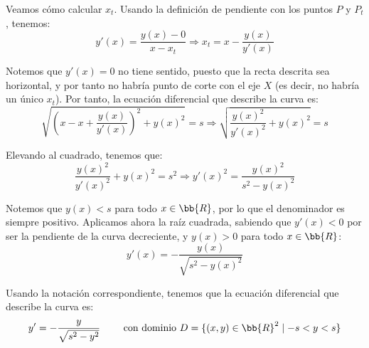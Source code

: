 \begin{ejercicio}
    Veamos cómo calcular $x_t$. Usando la definición de pendiente con los puntos $P$ y $P_t$, tenemos:
    \begin{equation*}
        y'(x) = \dfrac{y(x) - 0}{x - x_t} \Longrightarrow x_t = x - \dfrac{y(x)}{y'(x)}
    \end{equation*}

    Notemos que $y'(x)=0$ no tiene sentido, puesto que la recta descrita sea horizontal, y por tanto no habría punto de corte con el eje $X$ (es decir, no habría un único $x_t$). Por tanto, la ecuación diferencial que describe la curva es:
    \begin{equation*}
        \sqrt{\left(x-x + \dfrac{y(x)}{y'(x)}\right)^2 + y(x)^2} = s
        \Longrightarrow
        \sqrt{\dfrac{y(x)^2}{y'(x)^2} + y(x)^2} = s
    \end{equation*}

    Elevando al cuadrado, tenemos que:
    \begin{equation*}
        \dfrac{y(x)^2}{y'(x)^2} + y(x)^2 = s^2
        \Longrightarrow
        y'(x)^2 = \dfrac{y(x)^2}{s^2 - y(x)^2}
    \end{equation*}

    Notemos que $y(x)<s$ para todo $x\in \bb{R}$, por lo que el denominador es siempre positivo. Aplicamos ahora la raíz cuadrada, sabiendo que $y'(x)<0$ por ser la pendiente de la curva decreciente, y $y(x)>0$ para todo $x\in \bb{R}$:
    \begin{equation*}
        y'(x) = -\dfrac{y(x)}{\sqrt{s^2 - y(x)^2}}
    \end{equation*}

    Usando la notación correspondiente, tenemos que la ecuación diferencial que describe la curva es:
    \begin{equation*}
        y' = -\dfrac{y}{\sqrt{s^2 - y^2}} \qquad \text{ con dominio } D=\{(x, y)\in \bb{R}^2 \mid -s<y<s\}
    \end{equation*}
\end{ejercicio}


